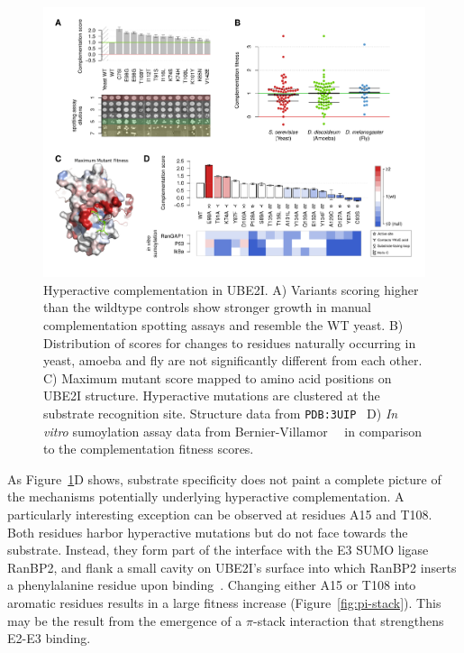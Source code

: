 \begin{figure}[h!]
	\centering
	\includegraphics[width=\textwidth]{img/hyperactive.pdf}
	\caption{Hyperactive complementation in UBE2I. A) Variants scoring higher than the wildtype controls show stronger growth in manual complementation spotting assays and resemble the WT yeast. B) Distribution of scores for changes to residues naturally occurring in yeast, amoeba and fly are not significantly different from each other. C) Maximum mutant score mapped to amino acid positions on UBE2I structure. Hyperactive mutations are clustered at the substrate recognition site. Structure data from \texttt{PDB:3UIP}~\cite{gareau_determinants_2012} D) \textit{In vitro} sumoylation assay data from Bernier-Villamor~\etal~\cite{bernier-villamor_structural_2002} in comparison to the complementation fitness scores.}
	\label{fig:hyperactive}
\end{figure}


As Figure~\ref{fig:hyperactive}D shows, substrate specificity does not paint a complete picture of the mechanisms potentially underlying hyperactive complementation. A particularly interesting exception can be observed at residues A15 and T108. Both residues harbor hyperactive mutations but do not face towards the substrate. Instead, they form part of the interface with the E3 SUMO ligase RanBP2, and flank a small cavity on UBE2I's surface into which RanBP2 inserts a phenylalanine residue upon binding~\cite{gareau_determinants_2012}. Changing either A15 or T108 into aromatic residues results in a large fitness increase (Figure~\ref{fig:pi-stack}). This may be the result from the emergence of a $\pi$-stack interaction that strengthens E2-E3 binding.

